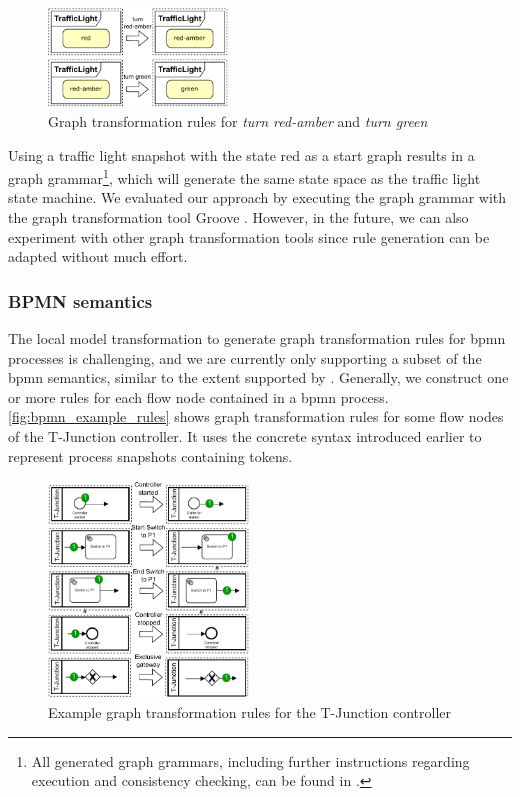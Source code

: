 \documentclass{jot}
\begin{document}
\begin{figure}[h]
    \centering
    \includegraphics[width=0.425\textwidth]{figures/sm_rules.pdf}
    \caption{Graph transformation rules for \emph{turn red-amber} and \emph{turn green}}
    \label{fig:sm_rules}
\end{figure}

Using a traffic light snapshot with the state red as a start graph results in a graph grammar\footnote{\label{footnote:GGinRepo}All generated graph grammars, including further instructions regarding execution and consistency checking, can be found in \cite{krauterArtifactsBehavioralConsistency2022}.}, which will generate the same state space as the traffic light state machine.
We evaluated our approach by executing the graph grammar with the graph transformation tool Groove \cite{ghamarianModellingAnalysisUsing2012, rensinkGROOVESimulatorTool2004}.
However, in the future, we can also experiment with other graph transformation tools since rule generation can be adapted without much effort.

\subsubsection{BPMN semantics}
The local model transformation to generate graph transformation rules for \gls*{bpmn} processes is challenging, and we are currently only supporting a subset of the \gls*{bpmn} semantics, similar to the extent supported by \cite{vangorpVisualTokenbasedFormalization2013}.
Generally, we construct one or more rules for each flow node contained in a \gls*{bpmn} process.
\autoref{fig:bpmn_example_rules} shows graph transformation rules for some flow nodes of the T-Junction controller.
It uses the concrete syntax introduced earlier to represent process snapshots containing tokens.

\begin{figure}[h]
    \centering
    \includegraphics[width=0.475\textwidth]{figures/bpmn_rules.pdf}
    \caption{Example graph transformation rules for the T-Junction controller}
    \label{fig:bpmn_example_rules}
\end{figure}
\end{document}
